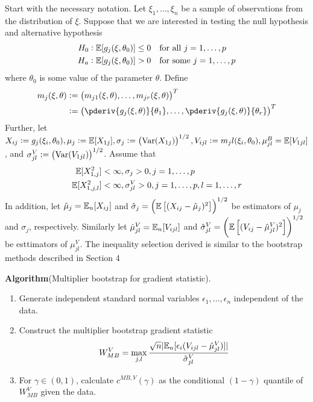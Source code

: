 Start with the necessary notation. Let $\xi_1, \dots, \xi_n$ be a sample of observations from the distribution of $\xi$. Suppose that we are interested in testing the null hypothesis and alternative hypothesis
\begin{align*}
    H_0: \mathbb{E}[g_j(\xi,\theta_0)] &\leq 0 \hbox{ }\hbox{ }\text{ for all }j = 1,\dots,p \\
    H_a: \mathbb{E}[g_j(\xi,\theta_0)] &> 0 \hbox{ }\hbox{ }\text{ for some }j = 1,\dots,p 
\end{align*}
where $\theta_0$ is some value of the parameter $\theta$. Define 
\begin{align*}
    m_j(\xi,\theta) &:= \left(m_{j1}(\xi,\theta),\dots,m_{jr}(\xi,\theta)\right)^T \\
                    &:= \left(\pderiv{g_j(\xi,\theta)}{\theta_1}, \dots, \pderiv{g_j(\xi,\theta)}{\theta_r}\right)^T
\end{align*}
Further, let $X_{ij} := g_j(\xi_i,\theta_0), \mu_j := \mathbb{E}[X_{1j}], \sigma_j := \left(\operatorname{Var}(X_{1j}) \right)^{1/2}, V_{ijl} := m_jl(\xi_i,\theta_0), \mu_{jl}^B = \mathbb{E}[V_{1jl}]$, and $\sigma_{jl}^V := \left(\operatorname{Var}(V_{1jl})\right)^{1/2}$. Assume that
\begin{align}
	\label{eq:CCK-42}
	\mathbb{E}[X_{1,j}^2] &< \infty, \sigma_j > 0, j = 1,\dots, p\\
	\label{eq:CCK-43}
	\mathbb{E}[X_{1,j,l}^2] &< \infty, \sigma_{jl}^V >0, j = 1,\dots,p, l = 1,\dots, r
\end{align}
In addition, let $\hat{\mu}_j = \mathbb{E}_n[X_{ij}]$ and $\hat{\sigma}_j = \left(\mathbb{E}\left[(X_{ij} -\hat{\mu}_j)^2\right]\right)^{1/2}$ be estimators of $\mu_j$ and $\sigma_j$, respectively. Similarly let  $\hat{\mu}_{jl}^V = \mathbb{E}_n[V_{ijl}]$ and  $\hat{\sigma}_{jl}^V = \left(\mathbb{E}\left[(V_{ij} -\hat{\mu}_{jl}^V)^2\right]\right)^{1/2}$ be esttimators of $\mu_{jl}^V$. The inequality selection derived is similar to the bootstrap methods described in Section 4

\textbf{Algorithm}(Multiplier bootstrap for gradient statistic).
\begin{enumerate}
	\item Generate independent standard normal variables $\epsilon_1, \dots, \epsilon_n$ independent of the data. 
	\item Construct the multiplier bootstrap gradient statistic 
	\begin{equation}
		\label{eq:CCK-44} 
		W_{MB}^V = \max_{j,l} \frac{\sqrt{n}|\mathbb{E}_n[\epsilon_i(V_{ijl}-\hat{\mu}_{jl}^V)]|}{\hat{\sigma}_{jl}^V}
	\end{equation}
	\item For $\gamma \in (0,1)$, calculate $c^{MB,V}(\gamma)$ as the conditional $(1-\gamma)$ quantile of $W_{MB}^V$ given the data.
\end{enumerate}

